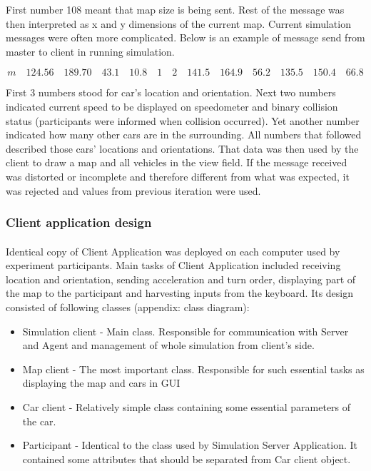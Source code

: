 \documentclass[11pt,english]{article}
\begin{document}
First number 108 meant that map size is being sent. Rest of the message was then interpreted as x and y dimensions of the current map.
Current simulation messages were often more complicated. Below is an example of message send from master to client in running simulation. 
 
\begin{equation}
m \quad 124.56 \quad 189.70 \quad 43.1 \quad 10.8 \quad 1 \quad 2 \quad 141.5 \quad 164.9  \quad 56.2 \quad 135.5 \quad 150.4  \quad 66.8
\end{equation}

First 3 numbers stood for car's location and orientation. Next two numbers indicated current speed to be displayed on speedometer and binary collision status (participants were informed when collision occurred). Yet another number indicated how many other cars are in the surrounding. All numbers that followed described those cars' locations and orientations. That data was then used by the client to draw a map and all vehicles in the view field. If the message received was distorted or incomplete and therefore different from what was expected, it was rejected and values from previous iteration were used.






\subsubsection{Client application design}
\paragraph{}

Identical copy of Client Application was deployed on  each computer used by experiment participants. Main tasks of Client Application included receiving location and orientation, sending acceleration and turn order, displaying part of the map to the participant and harvesting inputs from the keyboard. Its design consisted of following classes (appendix: class diagram):

\begin{itemize}
\item Simulation client - Main class. Responsible for communication with Server and Agent and management of whole simulation from client's side. 
\item Map client - The most important class. Responsible for such essential tasks as displaying the map and cars in GUI
\item Car client - Relatively simple class containing some essential parameters of the car. 
\item Participant - Identical to the class used by Simulation Server Application. It contained some attributes that should be separated from Car client object.
\end{itemize}
\end{document}
